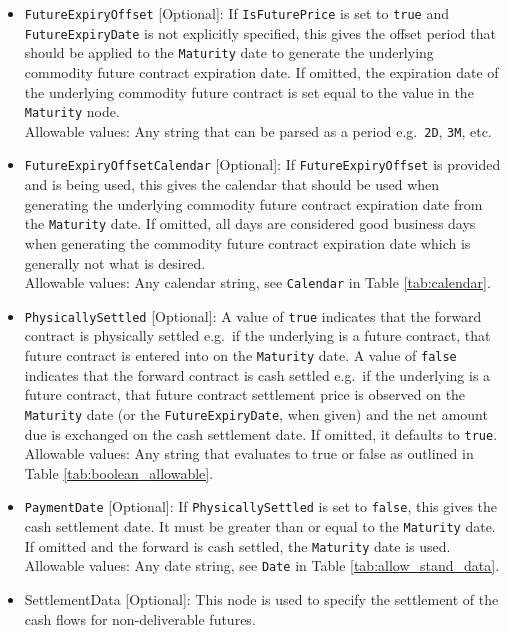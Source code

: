\begin{itemize}
\item \lstinline!FutureExpiryOffset! [Optional]: If \lstinline!IsFuturePrice! is set to \lstinline!true! and \lstinline!FutureExpiryDate! is not explicitly specified, this gives the offset period that should be applied to the \lstinline!Maturity! date to generate the underlying commodity future contract expiration date. If omitted, the expiration date of the underlying commodity future contract is set equal to the value in the \lstinline!Maturity! node. \\
Allowable values: Any string that can be parsed as a period e.g.\ \lstinline!2D!, \lstinline!3M!, etc.

\item \lstinline!FutureExpiryOffsetCalendar! [Optional]: If \lstinline!FutureExpiryOffset! is provided and is being used, this gives the calendar that should be used when generating the underlying commodity future contract expiration date from the \lstinline!Maturity! date. If omitted, all days are considered good business days when generating the commodity future contract expiration date which is generally not what is desired. \\
Allowable values: Any calendar string, see \lstinline!Calendar! in Table \ref{tab:calendar}.

\item \lstinline!PhysicallySettled! [Optional]: A value of \lstinline!true! indicates that the forward contract is physically settled e.g.\ if the underlying is a future contract, that future contract is entered into on the \lstinline!Maturity! date. A value of \lstinline!false! indicates that the forward contract is cash settled e.g.\ if the underlying is a future contract, that future contract settlement price is observed on the \lstinline!Maturity! date (or the \lstinline!FutureExpiryDate!, when given) and the net amount due is exchanged on the cash settlement date. If omitted, it defaults to \lstinline!true!. \\
Allowable values: Any string that evaluates to true or false as outlined in Table \ref{tab:boolean_allowable}.

\item \lstinline!PaymentDate! [Optional]: If \lstinline!PhysicallySettled! is set to \lstinline!false!, this gives the cash settlement date. It must be greater than or equal to the \lstinline!Maturity! date. If omitted and the forward is cash settled, the \lstinline!Maturity! date is used. \\
Allowable values: Any date string, see \lstinline!Date! in Table \ref{tab:allow_stand_data}.

\item SettlementData [Optional]: This node is used to specify  the settlement of the cash flows for non-deliverable futures.
\end{itemize}

